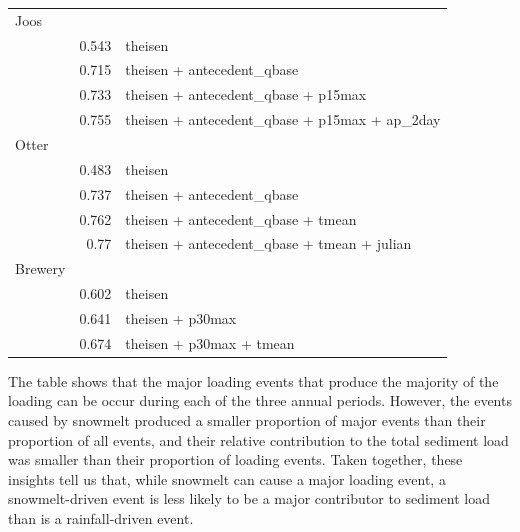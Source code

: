 \documentclass[12pt]{article}
\begin{document}
\begin{table}[h]
\begin{center}
\begin{tabular}{lrl}
    Joos & & \\
    & 0.543 & theisen\\
    & 0.715 & theisen + antecedent\_qbase\\
    & 0.733 & theisen + antecedent\_qbase + p15max\\
    & 0.755 & theisen + antecedent\_qbase + p15max + ap\_2day\\

    Otter & & \\
    & 0.483 & theisen\\
    & 0.737 & theisen + antecedent\_qbase\\
    & 0.762 & theisen + antecedent\_qbase + tmean\\
    & 0.77 & theisen + antecedent\_qbase + tmean + julian\\

    Brewery & & \\
    & 0.602 & theisen\\
    & 0.641 & theisen + p30max\\
    & 0.674 & theisen + p30max + tmean\\

    \end{tabular}
    \end{center}
\end{table}



The table shows that the major loading events that produce the majority of the loading can be occur during each of the three annual periods. However, the events caused by snowmelt produced a smaller proportion of major events than their proportion of all events, and their relative contribution to the total sediment load was smaller than their proportion of loading events. Taken together, these insights tell us that, while snowmelt can cause a major loading event, a snowmelt-driven event is less likely to be a major contributor to sediment load than is a rainfall-driven event.\\
\end{document}
